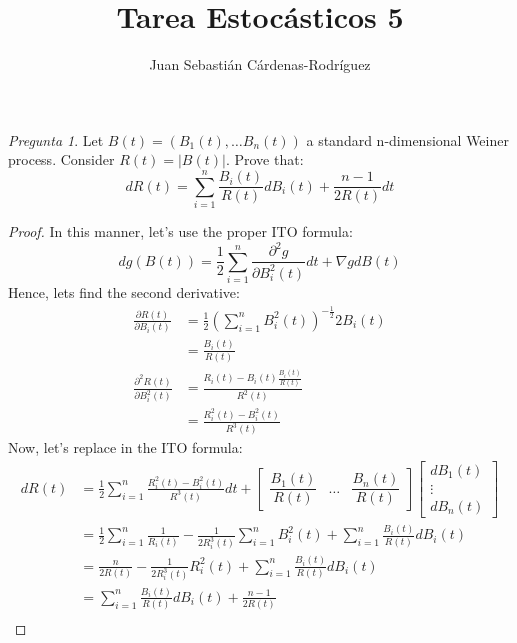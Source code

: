 \documentclass[11pt]{article}
\title{Tarea Estocásticos 5}
\author{Juan Sebastián Cárdenas-Rodríguez}
\date{}
\theoremstyle{definition}
\theoremstyle{remark}
\theoremstyle{remark}
\newtheorem{question}{Pregunta}
\begin{document}
\maketitle
\begin{question}
  Let $B(t) = (B_1(t), \dots B_n(t))$ a standard n-dimensional Weiner
  process. Consider $R(t) = \left|B(t)\right|$. Prove that:
  \begin{equation*}
    dR(t) = \sum_{i=1}^n\frac{B_i(t)}{R(t)}dB_i(t) + \frac{n - 1}{2R(t)}dt
  \end{equation*}
\end{question}
\begin{proof}
  In this manner, let's use the proper ITO formula:
  \begin{equation*}
    dg(B(t)) = \frac{1}{2} \sum_{i=1}^n \frac{\partial^2 g}{\partial B_i^2(t)}dt + \nabla g dB(t)
  \end{equation*}
  Hence, lets find the second derivative:
  \begin{align*}
    \frac{\partial R(t)}{\partial B_i(t)}
    &= \frac{1}{2}\left(\sum_{i=1}^nB_i^2(t)\right)^{-\frac{1}{2}} 2B_i(t) \\
    &= \frac{B_i(t)}{R(t)} \\
    \frac{\partial^2 R(t)}{\partial B_i^2(t)}
    &= \frac{R_i(t) - B_i(t)\frac{B_i(t)}{R(t)}}{R^2(t)} \\
    &= \frac{R_i^2(t) - B_i^2(t)}{R^3(t)}
  \end{align*}
  Now, let's replace in the ITO formula:
  \begin{align*}
    dR(t)
    &= \frac{1}{2} \sum_{i=1}^n \frac{R_i^2(t) - B_i^2(t)}{R^3(t)} dt +
      \begin{bmatrix}
        \dfrac{B_1(t)}{R(t)} & \dots & \dfrac{B_n(t)}{R(t)}
      \end{bmatrix}
      \begin{bmatrix}
        dB_1(t) \\
        \vdots \\
        dB_n(t)
      \end{bmatrix} \\
    &= \frac{1}{2}\sum_{i=1}^n \frac{1}{R_i(t)} -
      \frac{1}{2R_i^3(t)}\sum_{i=1}^nB_i^2(t) +
      \sum_{i=1}^n\frac{B_i(t)}{R(t)}dB_i(t) \\
    &= \frac{n}{2R(t)} - \frac{1}{2R_i^3(t)} R_i^2(t) +
      \sum_{i=1}^n\frac{B_i(t)}{R(t)}dB_i(t) \\
    &= \sum_{i=1}^n\frac{B_i(t)}{R(t)}dB_i(t) + \frac{n - 1}{2R(t)}\\
  \end{align*}
\end{proof}
\end{document}
